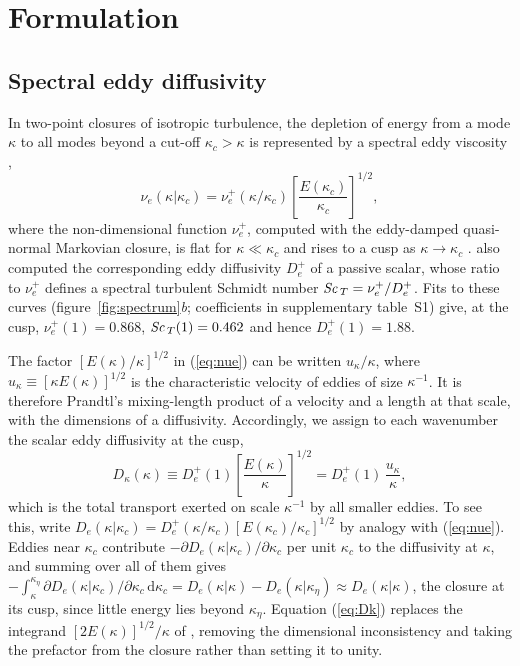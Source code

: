 \documentclass[lineno]{jfm}
\newcommand{\Sct}{\mbox{\textit{Sc}}_{\, T}}
\newcommand{\De}{D_e^{+}}
\begin{document}
\section{Formulation}\label{sec:formulation}

\subsection{Spectral eddy diffusivity}

In two-point closures of isotropic turbulence, the depletion of energy from a mode $\kappa$ to all modes beyond a cut-off $\kappa_c > \kappa$ is represented by a spectral eddy viscosity \citep{Kraichnan1976,CholletLesieur1981,Pope2000},
\begin{equation}
  \nu_e(\kappa | \kappa_c) = \nu_e^{+}(\kappa / \kappa_c) \left[\frac{E(\kappa_c)}{\kappa_c}\right]^{1/2},
  \label{eq:nue}
\end{equation}
where the non-dimensional function $\nu_e^{+}$, computed with the eddy-damped quasi-normal Markovian closure, is flat for $\kappa \ll \kappa_c$ and rises to a cusp as $\kappa \to \kappa_c$ \citep{Chollet1984}. \citet{Chollet1984} also computed the corresponding eddy diffusivity $\De$ of a passive scalar, whose ratio to $\nu_e^{+}$ defines a spectral turbulent Schmidt number $\Sct = \nu_e^{+} / \De$. Fits to these curves (figure~\ref{fig:spectrum}\textit{b}; coefficients in supplementary table~S1) give, at the cusp, $\nu_e^{+}(1) = 0.868$, $\Sct(1) = 0.462$ and hence $\De(1) = 1.88$.

The factor $[E(\kappa) / \kappa]^{1/2}$ in (\ref{eq:nue}) can be written $u_\kappa / \kappa$, where $u_\kappa \equiv [\kappa E(\kappa)]^{1/2}$ is the characteristic velocity of eddies of size $\kappa^{-1}$. It is therefore Prandtl's mixing-length product of a velocity and a length at that scale, with the dimensions of a diffusivity. Accordingly, we assign to each wavenumber the scalar eddy diffusivity at the cusp,
\begin{equation}
  D_\kappa(\kappa) \equiv \De(1) \left[\frac{E(\kappa)}{\kappa}\right]^{1/2} = \De(1) \, \frac{u_\kappa}{\kappa},
  \label{eq:Dk}
\end{equation}
which is the total transport exerted on scale $\kappa^{-1}$ by all smaller eddies. To see this, write $D_e(\kappa | \kappa_c) = \De(\kappa / \kappa_c) [E(\kappa_c) / \kappa_c]^{1/2}$ by analogy with (\ref{eq:nue}). Eddies near $\kappa_c$ contribute $-\partial D_e(\kappa | \kappa_c) / \partial \kappa_c$ per unit $\kappa_c$ to the diffusivity at $\kappa$, and summing over all of them gives $-\int_\kappa^{\kappa_\eta} \partial D_e(\kappa | \kappa_c) / \partial \kappa_c \, \mathrm{d} \kappa_c = D_e(\kappa | \kappa) - D_e(\kappa | \kappa_\eta) \approx D_e(\kappa | \kappa)$, the closure at its cusp, since little energy lies beyond $\kappa_\eta$. Equation (\ref{eq:Dk}) replaces the integrand $[2 E(\kappa)]^{1/2} / \kappa$ of \citet{Nivarti2019}, removing the dimensional inconsistency and taking the prefactor from the closure rather than setting it to unity.
\end{document}
